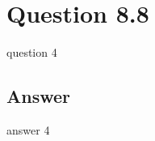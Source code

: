 \documentclass[letterpaper,11pt]{article}
\begin{document}
\noindent\makebox[\linewidth]{\rule{\textwidth}{0.4pt}}

\section*{Question 8.8}
\begin{spverbatim}
	question 4
\end{spverbatim}

\subsection*{Answer}
answer 4

\medskip


\end{document}
